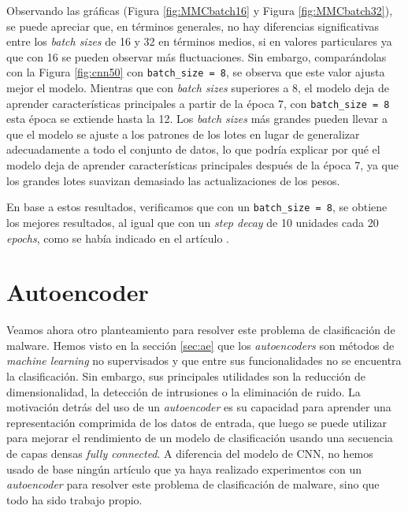 Observando las gráficas (Figura \ref{fig:MMCbatch16} y Figura \ref{fig:MMCbatch32}), se puede apreciar que, en términos generales, no hay diferencias significativas entre los \textit{batch sizes} de 16 y 32 en términos medios, si en valores particulares ya que con 16 se pueden observar más fluctuaciones. Sin embargo, comparándolas con la Figura \ref{fig:cnn50} con \lstinline|batch_size = 8|, se observa que este valor ajusta mejor el modelo. Mientras que con \textit{batch sizes} superiores a 8, el modelo deja de aprender características principales a partir de la época 7, con \lstinline|batch_size = 8| esta época se extiende hasta la 12. Los \textit{batch sizes} más grandes pueden llevar a que el modelo se ajuste a los patrones de los lotes en lugar de generalizar adecuadamente a todo el conjunto de datos, lo que podría explicar por qué el modelo deja de aprender características principales después de la época 7, ya que los grandes lotes suavizan demasiado las actualizaciones de los pesos.

En base a estos resultados, verificamos que con un \lstinline|batch_size = 8|, se obtiene los mejores resultados, al igual que con un \textit{step decay} de 10 unidades cada 20 \textit{epochs}, como se había indicado en el artículo \citep{kalash2018malware}.


\section{Autoencoder} \label{sec: 3.AE}

Veamos ahora otro planteamiento para resolver este problema de clasificación de malware. Hemos visto en la sección \ref{sec:ae} que los \textit{autoencoders} son métodos de \textit{machine learning} no supervisados y que entre sus funcionalidades no se encuentra la clasificación. Sin embargo, sus principales utilidades son la reducción de dimensionalidad, la detección de intrusiones o la eliminación de ruido. La motivación detrás del uso de un \textit{autoencoder} es su capacidad para aprender una representación comprimida de los datos de entrada, que luego se puede utilizar para mejorar el rendimiento de un modelo de clasificación usando una secuencia de capas densas \textit{fully connected}. A diferencia del modelo de CNN, no hemos usado de base ningún artículo que ya haya realizado experimentos con un \textit{autoencoder} para resolver este problema de clasificación de malware, sino que todo ha sido trabajo propio. 


